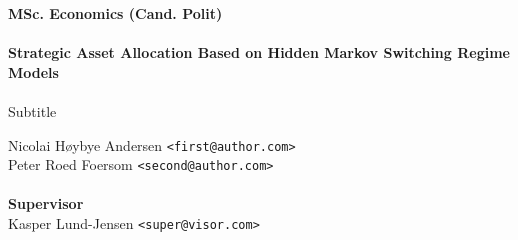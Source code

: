 \documentclass[a4paper,oneside]{memoir}
\begin{document}
    \thispagestyle{empty}
    \begin{adjustwidth}{-3cm}{-1.5cm}
    \vspace*{-1cm}
    \textbf{\Huge MSc. Economics (Cand. Polit)} \\
    \vspace*{2.5cm} \\
    \textbf{Strategic Asset Allocation Based on Hidden Markov Switching Regime Models} \\
    \vspace*{.1cm} \\
    {\huge Subtitle} \\
    \begin{tabbing}
    Nicolai Høybye Andersen \hspace{1cm} \= \texttt{<first@author.com>} \\
    Peter Roed Foersom \> \texttt{<second@author.com>} \\
    \\[12cm]
    \textbf{\Large Supervisor} \\
    Kasper Lund-Jensen \> \texttt{<super@visor.com>} \\
    \end{tabbing}
    \end{adjustwidth}
    \newpage
    \ClearWallPaper
\end{document}
